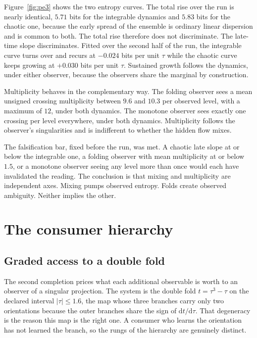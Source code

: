 \documentclass[aps,pre,reprint,nofootinbib]{revtex4-2}
\newcommand{\dd}{\mathrm{d}}
\begin{document}
Figure~\ref{fig:pe3} shows the two entropy curves.  The total rise over
the run is nearly identical, $5.71$ bits for the integrable dynamics and
$5.83$ bits for the chaotic one, because the early spread of the ensemble
is ordinary linear dispersion and is common to both.  The total rise
therefore does not discriminate.  The late-time
slope discriminates.  Fitted over the second half of the run, the
integrable curve turns over and recurs at $-0.024$ bits per unit $\tau$
while the chaotic curve keeps growing at $+0.030$ bits per unit $\tau$.
Sustained growth follows the dynamics, under either observer, because the
observers share the marginal by construction.

Multiplicity behaves in the complementary way.  The folding observer sees
a mean unsigned crossing multiplicity between $9.6$ and $10.3$ per
observed level, with a maximum of $12$, under both dynamics.  The
monotone observer sees exactly one crossing per level everywhere, under
both dynamics.  Multiplicity follows the observer's singularities and is
indifferent to whether the hidden flow mixes.

The falsification bar, fixed before the run, was met.  A chaotic late
slope at or below the integrable one, a folding observer with mean
multiplicity at or below $1.5$, or a monotone observer seeing any level
more than once would each have invalidated the reading.  The conclusion
is that mixing and multiplicity are independent axes.  Mixing pumps
observed entropy.  Folds create observed ambiguity.  Neither implies the
other.

\section{The consumer hierarchy}
\label{sec:pe5}

\subsection{Graded access to a double fold}

The second completion prices what each additional observable is worth to
an observer of a singular projection.  The system is the double fold
$t = \tau^3 - \tau$ on the declared interval $|\tau| \le 1.6$, the map
whose three branches carry only two orientations because the outer
branches share the sign of $\dd t/\dd\tau$.  That degeneracy is the reason
this map is the right one.  A consumer who learns the orientation has not
learned the branch, so the rungs of the hierarchy are genuinely distinct.
\end{document}
